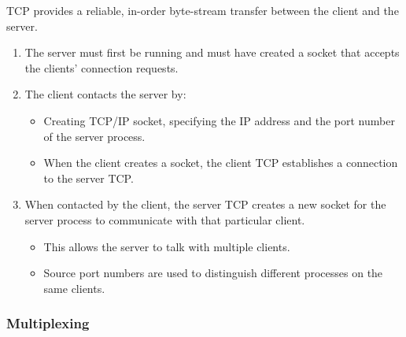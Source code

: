 TCP provides a reliable, in-order byte-stream transfer  between the client and the server.
\begin{enumerate}
    \item The server must first be running and must have created a socket that accepts the clients' connection requests.
    \item The client contacts the server by:
        \begin{itemize}
            \item Creating TCP/IP socket, specifying the IP address and the port number of the server process.
            \item When the client creates a socket, the client TCP establishes a connection to the server TCP.
        \end{itemize}
    \item When contacted by the client, the server TCP creates a new socket for the server process to communicate with that particular client.
        \begin{itemize}
            \item This allows the server to talk with multiple clients.
            \item Source port numbers are used to distinguish different processes on the same clients.
        \end{itemize}
\end{enumerate}

\subsubsection{Multiplexing}



